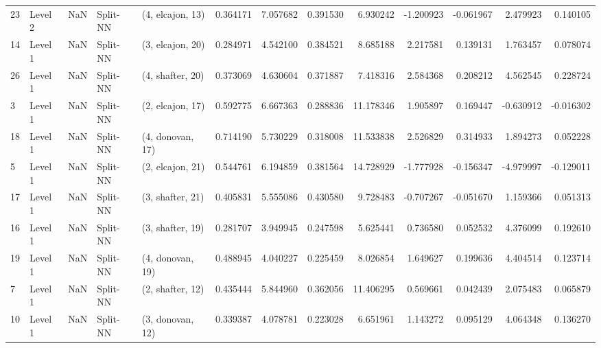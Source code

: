 \begin{tabular}{llrllrrrrrrrr}
23 &   Level 2 &    NaN &       Split-NN &  (4, elcajon, 13) &   0.364171 &   7.057682 &  0.391530 &   6.930242 &            -1.200923 &              -0.061967 &            2.479923 &              0.140105 \\
14 &   Level 1 &    NaN &       Split-NN &  (3, elcajon, 20) &   0.284971 &   4.542100 &  0.384521 &   8.685188 &             2.217581 &               0.139131 &            1.763457 &              0.078074 \\
26 &   Level 1 &    NaN &       Split-NN &  (4, shafter, 20) &   0.373069 &   4.630604 &  0.371887 &   7.418316 &             2.584368 &               0.208212 &            4.562545 &              0.228724 \\
3  &   Level 1 &    NaN &       Split-NN &  (2, elcajon, 17) &   0.592775 &   6.667363 &  0.288836 &  11.178346 &             1.905897 &               0.169447 &           -0.630912 &             -0.016302 \\
18 &   Level 1 &    NaN &       Split-NN &  (4, donovan, 17) &   0.714190 &   5.730229 &  0.318008 &  11.533838 &             2.526829 &               0.314933 &            1.894273 &              0.052228 \\
5  &   Level 1 &    NaN &       Split-NN &  (2, elcajon, 21) &   0.544761 &   6.194859 &  0.381564 &  14.728929 &            -1.777928 &              -0.156347 &           -4.979997 &             -0.129011 \\
17 &   Level 1 &    NaN &       Split-NN &  (3, shafter, 21) &   0.405831 &   5.555086 &  0.430580 &   9.728483 &            -0.707267 &              -0.051670 &            1.159366 &              0.051313 \\
16 &   Level 1 &    NaN &       Split-NN &  (3, shafter, 19) &   0.281707 &   3.949945 &  0.247598 &   5.625441 &             0.736580 &               0.052532 &            4.376099 &              0.192610 \\
19 &   Level 1 &    NaN &       Split-NN &  (4, donovan, 19) &   0.488945 &   4.040227 &  0.225459 &   8.026854 &             1.649627 &               0.199636 &            4.404514 &              0.123714 \\
7  &   Level 1 &    NaN &       Split-NN &  (2, shafter, 12) &   0.435444 &   5.844960 &  0.362056 &  11.406295 &             0.569661 &               0.042439 &            2.075483 &              0.065879 \\
10 &   Level 1 &    NaN &       Split-NN &  (3, donovan, 12) &   0.339387 &   4.078781 &  0.223028 &   6.651961 &             1.143272 &               0.095129 &            4.064348 &              0.136270 \\

\end{tabular}
